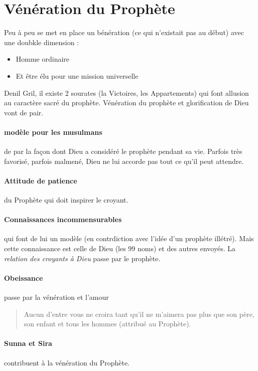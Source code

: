 \section{Vénération du Prophète}
Peu à peu se met en place un bénération (ce qui n'existait pas  au début) avec une doubkle dimension : 
\begin{itemize}
    \item Homme ordinaire
    \item Et être élu pour une mission universelle
\end{itemize}

Denil Gril, il existe 2 sourates (la Victoires, les Appartements) qui font allusion au caractère sacré du prophète.
Vénération du prophète et glorification de Dieu vont de pair. 

\paragraph{modèle pour les musulmans} de par la façon dont Dieu a considéré le prophète pendant sa vie. Parfois très favorisé, parfois malmené, Dieu ne lui accorde pas tout ce qu'il peut attendre.

\paragraph{Attitude de patience} du Prophète qui doit inspirer le croyant. 

\paragraph{Connaissances incommensurables} qui font de lui un modèle (en contrdiction avec l'idée d'un prophète illétré). Mais cette connaissance est celle de Dieu (les 99 noms) et des autres envoyés. La \textit{relation des croyants à Dieu} passe par le prophète.

\paragraph{Obeissance} passe par la vénération et l'amour

\begin{quote}
    Aucun d'entre vous ne croira tant qu'il ne m'aimera pas plus que son père, son enfant et tous les hommes (attribué au Prophète). 
\end{quote}

\paragraph{Sunna et Sira} contribuent à la vénération du Prophète.

